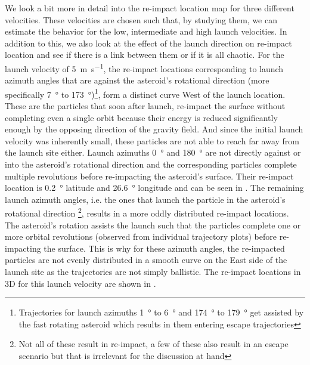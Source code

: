 \FloatBarrier
We look a bit more in detail into the re-impact location map for three different velocities. These velocities are chosen such that, by studying them, we can estimate the behavior for the low, intermediate and high launch velocities. In addition to this, we also look at the effect of the launch direction on re-impact location and see if there is a link between them or if it is all chaotic.
%
\newline\newline
%
For the launch velocity of \SI{5}{\metre \per \second}, the re-impact locations corresponding to launch azimuth angles that are against the asteroid's rotational direction (more specifically \SI{7}{\degree} to \SI{173}{\degree})\footnote{Trajectories for launch azimuths \SI{1}{\degree} to \SI{6}{\degree} and \SI{174}{\degree} to \SI{179}{\degree} get assisted by the fast rotating asteroid which results in them entering escape trajectories}, form a distinct curve West of the launch location. These are the particles that soon after launch, re-impact the surface without completing even a single orbit because their energy is reduced significantly enough by the opposing direction of the gravity field. And since the initial launch velocity was inherently small, these particles are not able to reach far away from the launch site either. Launch azimuths \SI{0}{\degree} and \SI{180}{\degree} are not directly against or into the asteroid's rotational direction and the corresponding particles complete multiple revolutions before re-impacting the asteroid's surface. Their re-impact location is \SI{0.2}{\degree} latitude and \SI{26.6}{\degree} longitude and can be seen in . The remaining launch azimuth angles, i.e. the ones that launch the particle in the asteroid's rotational direction \footnote{Not all of these result in re-impact, a few of these also result in an escape scenario but that is irrelevant for the discussion at hand}, results in a more oddly distributed re-impact locations. The asteroid's rotation assists the launch such that the particles complete one or more orbital revolutions (observed from individual trajectory plots) before re-impacting the surface. This is why for these azimuth angles, the re-impacted particles are not evenly distributed in a smooth curve on the East side of the launch site as the trajectories are not simply ballistic. The re-impact locations in 3D for this launch velocity are shown in .
